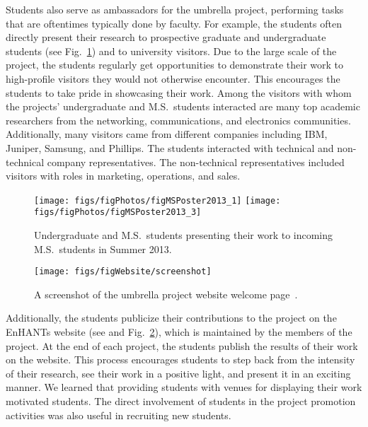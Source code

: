 \documentclass[journal,twopages]{IEEEtran}
\newcommand{\makered}[1]{\color{black}#1\color{black}}
\begin{document}
\makered{Students also serve as ambassadors for the umbrella project,
performing tasks that are oftentimes typically done by faculty. For example, the students often directly present their research to
prospective graduate and undergraduate students (see Fig.~\ref{fig:MSPosterSession}) and to university visitors. Due to the large scale of the project, the students
regularly get opportunities to demonstrate their work to high-profile visitors
they would not otherwise encounter. This encourages the students to take pride in showcasing their work.
Among the visitors with whom the projects' undergraduate and M.S.\ students interacted are
many top academic researchers from the networking, communications, and electronics communities.
Additionally, many visitors came from different companies including IBM, Juniper, Samsung, and Phillips. The students interacted with technical and non-technical company representatives. The non-technical representatives included visitors with roles in marketing, operations, and sales.}

\begin{figure}
\centering
{\texttt{[image: figs/figPhotos/figMSPoster2013\_1]}}
\hspace*{0.03\columnwidth}
{\texttt{[image: figs/figPhotos/figMSPoster2013\_3]}}
\caption{\label{fig:MSPosterSession} Undergraduate and M.S.\ students presenting their work to incoming M.S.\ students in Summer 2013. }
\end{figure}
\begin{figure}\centering
\texttt{[image: figs/figWebsite/screenshot]}
\caption{\label{fig:website}A screenshot of the umbrella project website welcome page~\cite{EnHANTsProject}. }
\end{figure}



\makered{Additionally, the students publicize their contributions
to the project on the EnHANTs website (see \cite{EnHANTsProject} and Fig.~\ref{fig:website}), which is maintained by the members of the project.
At the end of each project, the students publish the results of their work on the website. This process encourages students to step back from the intensity of their research,
see their work in a positive light, and present it in an exciting manner.
We learned that providing students with venues for displaying their work motivated students.  The direct involvement of students in the project promotion activities was also useful in recruiting new students. }
\end{document}
